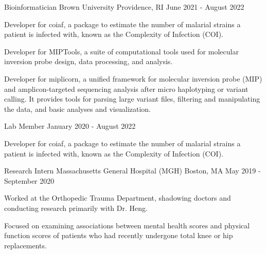 
\begin{cventries}

  \cventry
    {Bioinformatician} %
    {Brown University} %
    {Providence, RI} %
    {June 2021 - August 2022} %
    {
      \begin{cvitems} %
        \item {Developer for coiaf, a package to estimate the number of malarial
        strains a patient is infected with, known as the Complexity of 
        Infection (COI).}
        \item {Developer for MIPTools, a suite of computational tools used for
        molecular inversion probe design, data processing, and analysis.}
        \item {Developer for miplicorn, a unified framework for molecular
        inversion probe (MIP) and amplicon-targeted sequencing analysis after micro haplotyping or variant calling. It provides tools for parsing large variant files, filtering and manipulating the data, and basic analyses and visualization.}
      \end{cvitems}
    }

\cventry
    {Lab Member} %
    {} %
    {} %
    {January 2020 - August 2022} %
    {
      \begin{cvitems} %
        \item {Developer for coiaf, a package to estimate the number of malarial
        strains a patient is infected with, known as the Complexity of
        Infection (COI).}
      \end{cvitems}
    }

  \cventry
    {Research Intern} %
    {Massachusetts General Hospital (MGH)} %
    {Boston, MA} %
    {May 2019 - September 2020} %
    {
      \begin{cvitems} %
        \item {Worked at the Orthopedic Trauma Department, shadowing doctors and conducting research primarily with Dr. Heng.} 
        \item {Focused on examining associations between mental health scores
        and physical function scores of patients who had recently undergone total knee or hip replacements.}
      \end{cvitems}
    }


\end{cventries}
